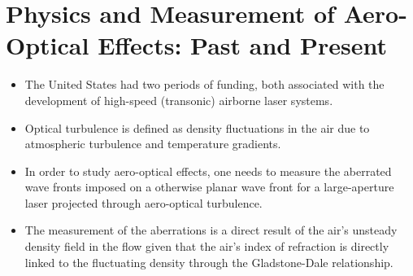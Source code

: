     \section{Physics and Measurement of Aero-Optical Effects: Past and Present \cite{jumper:arofm:2017}}
        \begin{itemize}
            \item The United States had two periods of funding, both associated with the development of high-speed (transonic) airborne laser systems.
            \item Optical turbulence is defined as density fluctuations in the air due to atmospheric turbulence and temperature gradients. 
            \item In order to study aero-optical effects, one needs to measure the aberrated wave fronts imposed on a otherwise planar wave front for a large-aperture laser projected through aero-optical turbulence. 
            \item The measurement of the aberrations is a direct result of the air's unsteady density field in the flow given that the air's index of refraction is directly linked to the fluctuating density through the Gladstone-Dale relationship. 
        \end{itemize}

\newpage
\printbibliography[title=Bibliography]

